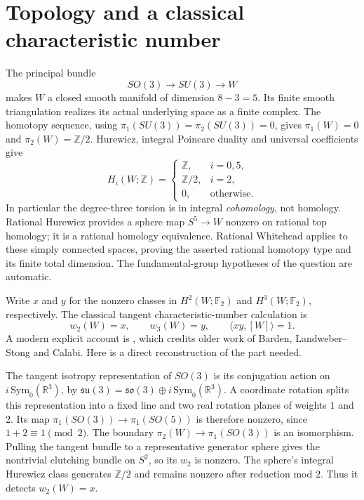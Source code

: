 \documentclass[10pt]{article}
\begin{document}
\section{Topology and a classical characteristic number}
The principal bundle
\[
 SO(3)\longrightarrow SU(3)\longrightarrow W
\]
makes \(W\) a closed smooth manifold of dimension \(8-3=5\).
Its finite smooth triangulation realizes its actual underlying space as
a finite complex. The homotopy sequence, using
\(\pi_1(SU(3))=\pi_2(SU(3))=0\), gives
\(\pi_1(W)=0\) and \(\pi_2(W)=\mathbb Z/2\).
Hurewicz, integral Poincare duality and universal coefficients give
\[
 H_i(W;\mathbb Z)=
 \begin{cases}
 \mathbb Z,&i=0,5,\\
 \mathbb Z/2,&i=2,\\
 0,&\text{otherwise}.
 \end{cases}
\]
In particular the degree-three torsion is in integral \emph{cohomology},
not homology. Rational Hurewicz provides a sphere map \(S^5\to W\)
nonzero on rational top homology; it is a rational homology equivalence.
Rational Whitehead applies to these simply connected spaces, proving
the asserted rational homotopy type and its finite total dimension.
The fundamental-group hypotheses of the question are automatic.

Write \(x\) and \(y\) for the nonzero classes in
\(H^2(W;\mathbb F_2)\) and \(H^3(W;\mathbb F_2)\), respectively.
The classical tangent characteristic-number calculation is
\begin{equation}\label{number}
 w_2(W)=x,\qquad w_3(W)=y,\qquad
 \langle xy,[W]\rangle=1.
\end{equation}
A modern explicit account is \cite[Lemma~4.41, Corollary~4.44,
Proposition~4.45]{DY}, which credits older work of Barden,
Landweber--Stong and Calabi. Here is a direct reconstruction of the part
needed.

The tangent isotropy representation of \(SO(3)\) is its conjugation action
on \(i\,\mathrm{Sym}_0(\mathbb R^3)\), by
\(\mathfrak{su}(3)=\mathfrak{so}(3)\oplus i\,\mathrm{Sym}_0(\mathbb R^3)\).
A coordinate rotation splits this representation into a fixed line and
two real rotation planes of weights \(1\) and \(2\). Its map
\(\pi_1(SO(3))\to\pi_1(SO(5))\) is therefore nonzero, since
\(1+2\equiv1\pmod2\).
The boundary \(\pi_2(W)\to\pi_1(SO(3))\) is an isomorphism.
Pulling the tangent bundle to a representative generator sphere gives
the nontrivial clutching bundle on \(S^2\), so its \(w_2\) is nonzero.
The sphere's integral Hurewicz class generates \(\mathbb Z/2\) and remains
nonzero after reduction mod \(2\). Thus it detects \(w_2(W)=x\).
\end{document}
